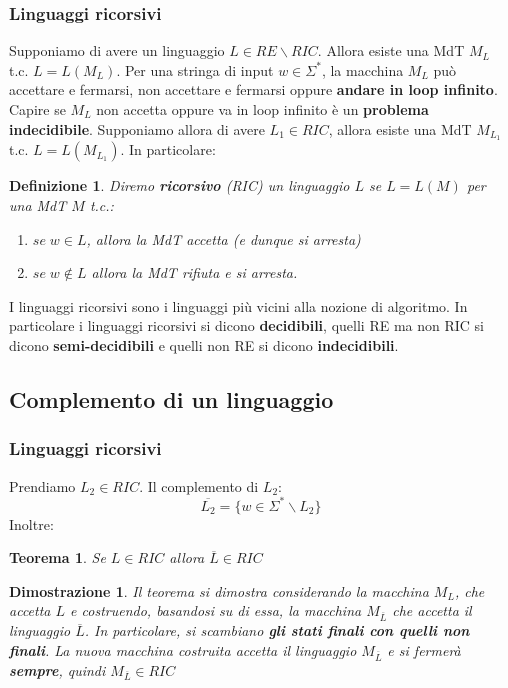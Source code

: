 \documentclass[12pt]{article}
\newtheorem{Definizione}{Definizione}[subsection]
\newtheorem{Teorema}{Teorema}[subsection]
\newtheorem{Dimostrazione}{Dimostrazione}[subsection]
\begin{document}
\subsubsection{Linguaggi ricorsivi}
Supponiamo di avere un linguaggio $L \in RE \backslash RIC$. Allora esiste una MdT $M_L$ t.c. $L = L(M_L)$. Per una stringa di input $w \in \Sigma^*$, la macchina $M_L$ può accettare e fermarsi, non accettare e fermarsi oppure \textbf{andare in loop infinito}. Capire se $M_L$ non accetta oppure va in loop infinito è un \textbf{problema indecidibile}. \newline
Supponiamo allora di avere $L_1 \in RIC$, allora esiste una MdT $M_{L_1}$ t.c. $L = L(M_{L_1})$. In particolare:
\begin{Definizione}
    Diremo \textbf{ricorsivo} (RIC) un linguaggio $L$ se $L = L(M)$ per una MdT $M$ t.c.:
    \begin{enumerate}
        \item $se \; w \in L$, allora la MdT accetta (e dunque si arresta)
        \item $se  \; w \not\in L$ allora la MdT rifiuta e si arresta.
    \end{enumerate}
\end{Definizione}
I linguaggi ricorsivi sono i linguaggi più vicini alla nozione di algoritmo. In particolare i linguaggi ricorsivi si dicono \textbf{decidibili}, quelli RE ma non RIC si dicono \textbf{semi-decidibili} e quelli non RE si dicono \textbf{indecidibili}.
\subsection{Complemento di un linguaggio}
\subsubsection{Linguaggi ricorsivi}
Prendiamo $L_2 \in RIC$. Il complemento di $L_2$:
$$\overline{L_2} = \{w \in \Sigma^* \backslash L_2\}$$
Inoltre:
\begin{Teorema}
    Se $L \in RIC$ allora $\overline{L} \in RIC$
\end{Teorema}
\begin{Dimostrazione}
    Il teorema si dimostra considerando la macchina $M_L$, che accetta $L$ e costruendo, basandosi su di essa, la macchina $M_{\overline{L}}$ che accetta il linguaggio $\overline{L}$. In particolare, si scambiano \textbf{gli stati finali con quelli non finali}. La nuova macchina costruita accetta il linguaggio $M_{\overline{L}}$ e si fermerà \textbf{sempre}, quindi $M_{\overline{L}} \in RIC$
\end{Dimostrazione}
\end{document}
